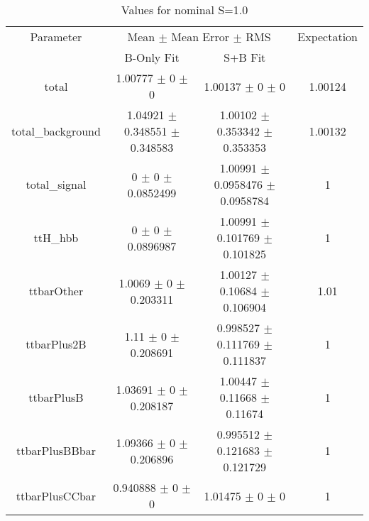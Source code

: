 \begin{table}
\centering
\caption{Values for nominal S=1.0}
\begin{tabular}{cccc}
\toprule
Parameter & \multicolumn{2}{c}{Mean $\pm$ Mean Error $\pm$ RMS} & Expectation\\
 & B-Only Fit & S+B Fit & \\
\midrule
total & \num{1.00777} $\pm$ \num{0} $\pm$ \num{0} & \num{1.00137} $\pm$ \num{0} $\pm$ \num{0} & \num{1.00124}\\
total\_background & \num{1.04921} $\pm$ \num{0.348551} $\pm$ \num{0.348583} & \num{1.00102} $\pm$ \num{0.353342} $\pm$ \num{0.353353} & \num{1.00132}\\
total\_signal & \num{0} $\pm$ \num{0} $\pm$ \num{0.0852499} & \num{1.00991} $\pm$ \num{0.0958476} $\pm$ \num{0.0958784} & \num{1}\\
ttH\_hbb & \num{0} $\pm$ \num{0} $\pm$ \num{0.0896987} & \num{1.00991} $\pm$ \num{0.101769} $\pm$ \num{0.101825} & \num{1}\\
ttbarOther & \num{1.0069} $\pm$ \num{0} $\pm$ \num{0.203311} & \num{1.00127} $\pm$ \num{0.10684} $\pm$ \num{0.106904} & \num{1.01}\\
ttbarPlus2B & \num{1.11} $\pm$ \num{0} $\pm$ \num{0.208691} & \num{0.998527} $\pm$ \num{0.111769} $\pm$ \num{0.111837} & \num{1}\\
ttbarPlusB & \num{1.03691} $\pm$ \num{0} $\pm$ \num{0.208187} & \num{1.00447} $\pm$ \num{0.11668} $\pm$ \num{0.11674} & \num{1}\\
ttbarPlusBBbar & \num{1.09366} $\pm$ \num{0} $\pm$ \num{0.206896} & \num{0.995512} $\pm$ \num{0.121683} $\pm$ \num{0.121729} & \num{1}\\
ttbarPlusCCbar & \num{0.940888} $\pm$ \num{0} $\pm$ \num{0} & \num{1.01475} $\pm$ \num{0} $\pm$ \num{0} & \num{1}\\
\bottomrule
\end{tabular}
\end{table}